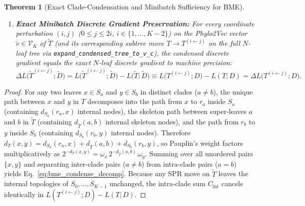 \documentclass[11pt,a4paper]{article}
\newtheorem{theorem}{Theorem}[section]
\theoremstyle{definition}
\begin{document}
\begin{theorem}[Exact Clade-Condensation and Minibatch Sufficiency for BME]
\begin{enumerate}
\begin{equation}
    L(T; D) = L(\widetilde{T}; \widetilde{D}) + \sum_{k=0}^{K-1} \sum_{\substack{x, y \in S_k \\ x < y}} D_{xy} \, 2^{-d_{S_k}(x, y)}.
    \label{eq:bme_condense_decomp}
    \end{equation}
    \item \textbf{Exact Minibatch Discrete Gradient Preservation:} For every coordinate perturbation $(i, j)$ ($0 \le j \le 2i$, $i \in \{1, \dots, K-2\}$) on the Phylo2Vec vector $\widetilde{v} \in \mathcal{V}_K$ of $\widetilde{T}$ (and its corresponding subtree move $T \to T^{(i \leftarrow j)}$ on the full $N$-leaf tree via \texttt{expand\_condensed\_tree\_to\_v\_c}), the condensed discrete gradient equals the exact $N$-leaf discrete gradient to machine precision:
    \begin{equation}
    \Delta L\big(\widetilde{T}^{(i \leftarrow j)}; \widetilde{D}\big) = L\big(\widetilde{T}^{(i \leftarrow j)}; \widetilde{D}\big) - L\big(\widetilde{T}; \widetilde{D}\big) \equiv L\big(T^{(i \leftarrow j)}; D\big) - L(T; D) = \Delta L\big(T^{(i \leftarrow j)}; D\big).
    \end{equation}
\end{enumerate}
\end{theorem}
\begin{proof}
For any two leaves $x \in S_a$ and $y \in S_b$ in distinct clades ($a \neq b$), the unique path between $x$ and $y$ in $T$ decomposes into the path from $x$ to $r_a$ inside $S_a$ (containing $d_{S_a}(r_a, x)$ internal nodes), the skeleton path between super-leaves $a$ and $b$ in $\widetilde{T}$ (containing $d_{\widetilde{T}}(a, b)$ internal skeleton nodes), and the path from $r_b$ to $y$ inside $S_b$ (containing $d_{S_b}(r_b, y)$ internal nodes). Therefore $d_T(x, y) = d_{S_a}(r_a, x) + d_{\widetilde{T}}(a, b) + d_{S_b}(r_b, y)$, so Pauplin's weight factors multiplicatively as $2^{-d_T(x,y)} = \omega_x \, 2^{-d_{\widetilde{T}}(a,b)} \, \omega_y$. Summing over all unordered pairs $\{x, y\}$ and separating inter-clade pairs ($a \neq b$) from intra-clade pairs ($a = b$) yields Eq.~\eqref{eq:bme_condense_decomp}. Because any SPR move on $\widetilde{T}$ leaves the internal topologies of $S_0, \dots, S_{K-1}$ unchanged, the intra-clade sum $C_{\text{int}}$ cancels identically in $L(T^{(i \leftarrow j)}; D) - L(T; D)$.
\end{proof}
\end{document}
